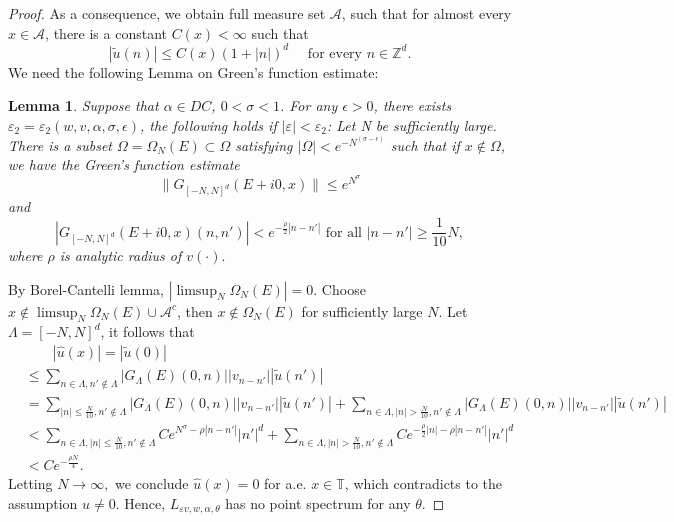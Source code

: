\documentclass[11pt]{amsart}
\newtheorem{lemma}[theorem]{Lemma}
\theoremstyle{remark}
\theoremstyle{definition}
\newcommand{\T}{{\mathbf T}}
\def\T{{\mathbb T}}
\begin{document}
\begin{proof}
As a consequence, we obtain  full measure set $\mathcal{A}$, such that for  almost every $x\in \mathcal{A}$, there is a constant $C(x)<\infty$ such that
$$
|\tilde{u}(n)| \leq C(x)(1+|n|)^d \quad \text { for every } n \in \mathbb{Z}^d .
$$
We need the following Lemma on Green's function estimate:
\begin{lemma}\cite{Bourgain,Liu}
	Suppose that $\alpha\in DC$, $0<\sigma<1$. For any $\epsilon>0$, there exists $\varepsilon_2=\varepsilon_2(w,v,\alpha,\sigma,\epsilon)$, the following holds if $|\varepsilon|<\varepsilon_2$:
	Let N be sufficiently large. There is a subset $\Omega=\Omega_N(E)\subset \Omega $ satisfying $|\Omega|<e^{-N^{(\sigma-\epsilon)}}$ such that if $x\notin\Omega$, we have the Green's function estimate 
    $$\|G_{[-N,N]^d}(E+i0,x)\|\leq e^{N^\sigma}$$ and
	$$|G_{[-N,N]^d}(E+i0,x)(n,n')|<e^{-\frac{\rho}{2}|n-n'|} \text{ for all } |n-n'|\geq\frac{1}{10} N,$$ where $\rho$ is analytic radius of $v(\cdot).$
\end{lemma}
By Borel-Cantelli lemma, $|\limsup_N\Omega_N(E)|=0.$ Choose $x\notin \limsup_N\Omega_N(E)\cup \mathcal{A}^c$, then  $x\notin\Omega_N(E)$ for sufficiently large $N.$
Let $\Lambda=[-N,N]^d$, it follows that
 $$\begin{aligned}
	&\qquad|\hat{u}(x)|=|\tilde{u}(0)|\\&\leq\sum_{n\in\Lambda,n'\notin\Lambda}|G_{\Lambda}(E)(0,n)| |v_{n-n'}| |\tilde{u}(n')|\\
    &=\sum_{|n|\leq\frac{N}{10},n'\notin\Lambda}|G_{\Lambda}(E)(0,n)| |v_{n-n'}| |\tilde{u}(n')|+\sum_{n\in\Lambda,|n|>\frac{N}{10},n'\notin\Lambda}|G_{\Lambda}(E)(0,n)| |v_{n-n'}| |\tilde{u}(n')|\\
	&<\sum_{n\in\Lambda,|n|\leq\frac{N}{10},n'\notin\Lambda}Ce^{N^\sigma-\rho|n-n'|}|n'|^d+\sum_{n\in\Lambda,|n|>\frac{N}{10},n'\notin\Lambda}Ce^{-\frac{\rho}{2}|n|-\rho|n-n'|}|n'|^d\\
	&<Ce^{-\frac{\rho N}{4}}.
\end{aligned}$$
Letting $N\rightarrow\infty,$ we conclude $\hat{u}(x)=0$ for a.e. $x\in\T$, which  contradicts to the assumption $u\neq 0$. Hence, $L_{\varepsilon v,w,\alpha,\theta}$   has no point spectrum for any $\theta$.	
\end{proof}
\end{document}
